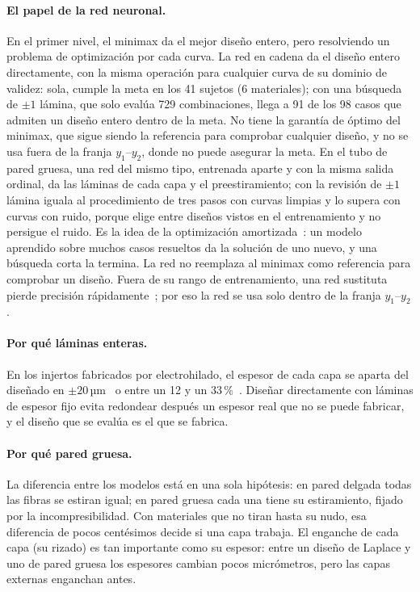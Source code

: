\paragraph{El papel de la red neuronal.} En el primer nivel, el minimax da el mejor diseño entero, pero resolviendo un problema de optimización por cada curva. La red en cadena da el diseño entero directamente, con la misma operación para cualquier curva de su dominio de validez: sola, cumple la meta en los 41 sujetos (6 materiales); con una búsqueda de $\pm1$ lámina, que solo evalúa 729 combinaciones, llega a 91 de los 98 casos que admiten un diseño entero dentro de la meta. No tiene la garantía de óptimo del minimax, que sigue siendo la referencia para comprobar cualquier diseño, y no se usa fuera de la franja $y_1$--$y_2$, donde no puede asegurar la meta. En el tubo de pared gruesa, una red del mismo tipo, entrenada aparte y con la misma salida ordinal, da las láminas de cada capa y el preestiramiento; con la revisión de $\pm1$ lámina iguala al procedimiento de tres pasos con curvas limpias y lo supera con curvas con ruido, porque elige entre diseños vistos en el entrenamiento y no persigue el ruido. Es la idea de la optimización amortizada~\cite{amos}: un modelo aprendido sobre muchos casos resueltos da la solución de uno nuevo, y una búsqueda corta la termina. La red no reemplaza al minimax como referencia para comprobar un diseño. Fuera de su rango de entrenamiento, una red sustituta pierde precisión rápidamente~\cite{utrera}; por eso la red se usa solo dentro de la franja $y_1$--$y_2$.

\paragraph{Por qué láminas enteras.} En los injertos fabricados por electrohilado, el espesor de cada capa se aparta del diseñado en $\pm20$\,µm~\cite{harrison} o entre un 12 y un 33\,\%~\cite{tamimi}. Diseñar directamente con láminas de espesor fijo evita redondear después un espesor real que no se puede fabricar, y el diseño que se evalúa es el que se fabrica.

\paragraph{Por qué pared gruesa.} La diferencia entre los modelos está en una sola hipótesis: en pared delgada todas las fibras se estiran igual; en pared gruesa cada una tiene su estiramiento, fijado por la incompresibilidad. Con materiales que no tiran hasta su nudo, esa diferencia de pocos centésimos decide si una capa trabaja. El enganche de cada capa (su rizado) es tan importante como su espesor: entre un diseño de Laplace y uno de pared gruesa los espesores cambian pocos micrómetros, pero las capas externas enganchan antes.

